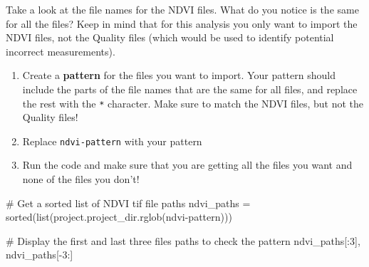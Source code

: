 \documentclass[
  letterpaper,
  DIV=11,
  numbers=noendperiod,
  oneside]{scrreprt}
\newenvironment{Shaded}{\begin{snugshade}}{\end{snugshade}}
\newcommand{\BuiltInTok}[1]{\textcolor[rgb]{0.00,0.23,0.31}{#1}}
\newcommand{\CommentTok}[1]{\textcolor[rgb]{0.37,0.37,0.37}{#1}}
\newcommand{\DecValTok}[1]{\textcolor[rgb]{0.68,0.00,0.00}{#1}}
\newcommand{\NormalTok}[1]{\textcolor[rgb]{0.00,0.23,0.31}{#1}}
\newcommand{\OperatorTok}[1]{\textcolor[rgb]{0.37,0.37,0.37}{#1}}
\newcommand{\StringTok}[1]{\textcolor[rgb]{0.13,0.47,0.30}{#1}}
\providecommand{\tightlist}{%
  \setlength{\itemsep}{0pt}\setlength{\parskip}{0pt}}
\begin{document}
\begin{tcolorbox}[enhanced jigsaw, colbacktitle=quarto-callout-color!10!white, opacityback=0, bottomtitle=1mm, toptitle=1mm, bottomrule=.15mm, left=2mm, colframe=quarto-callout-color-frame, leftrule=.75mm, opacitybacktitle=0.6, colback=white, rightrule=.15mm, toprule=.15mm, breakable, titlerule=0mm, title=\textcolor{quarto-callout-color}{\faInfo}\hspace{0.5em}{Reflect and Respond}, coltitle=black, arc=.35mm]

Take a look at the file names for the NDVI files. What do you notice is
the same for all the files? Keep in mind that for this analysis you only
want to import the NDVI files, not the Quality files (which would be
used to identify potential incorrect measurements).

\end{tcolorbox}

\begin{tcolorbox}[enhanced jigsaw, colbacktitle=quarto-callout-color!10!white, opacityback=0, bottomtitle=1mm, toptitle=1mm, bottomrule=.15mm, left=2mm, colframe=quarto-callout-color-frame, leftrule=.75mm, opacitybacktitle=0.6, colback=white, rightrule=.15mm, toprule=.15mm, breakable, titlerule=0mm, title=\textcolor{quarto-callout-color}{\faInfo}\hspace{0.5em}{Try It}, coltitle=black, arc=.35mm]

\begin{enumerate}
\def\labelenumi{\arabic{enumi}.}
\tightlist
\item
  Create a \textbf{pattern} for the files you want to import. Your
  pattern should include the parts of the file names that are the same
  for all files, and replace the rest with the \texttt{*} character.
  Make sure to match the NDVI files, but not the Quality files!
\item
  Replace \texttt{ndvi-pattern} with your pattern
\item
  Run the code and make sure that you are getting all the files you want
  and none of the files you don't!
\end{enumerate}

\end{tcolorbox}

\begin{Shaded}
\begin{Highlighting}[]
\CommentTok{\# Get a sorted list of NDVI tif file paths}
\NormalTok{ndvi\_paths }\OperatorTok{=} \BuiltInTok{sorted}\NormalTok{(}\BuiltInTok{list}\NormalTok{(project.project\_dir.rglob(}\StringTok{\textquotesingle{}ndvi{-}pattern\textquotesingle{}}\NormalTok{)))}

\CommentTok{\# Display the first and last three files paths to check the pattern}
\NormalTok{ndvi\_paths[:}\DecValTok{3}\NormalTok{], ndvi\_paths[}\OperatorTok{{-}}\DecValTok{3}\NormalTok{:]}
\end{Highlighting}
\end{Shaded}
\end{document}
